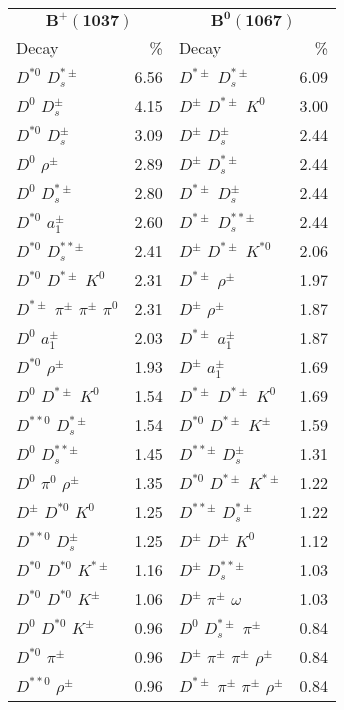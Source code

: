 \documentclass[6pt]{article}
\begin{document}
\begin{tabular}{lr|lr}
\multicolumn{2}{c|}{$\boldsymbol{B^+(1037)}$} & \multicolumn{2}{c}{$\boldsymbol{B^0(1067)}$} \\
Decay & \% & Decay & \% \\ \hline \hline
$D^{*0}$ $D_s^{*\pm}$ & 6.56 & $D^{*\pm}$ $D_s^{*\pm}$ & 6.09 \\
$D^0$ $D_s^{\pm}$ & 4.15 & $D^{\pm}$ $D^{*\pm}$ $K^0$ & 3.00 \\
$D^{*0}$ $D_s^{\pm}$ & 3.09 & $D^{\pm}$ $D_s^{\pm}$ & 2.44 \\
$D^0$ $\rho^{\pm}$ & 2.89 & $D^{\pm}$ $D_s^{*\pm}$ & 2.44 \\
$D^0$ $D_s^{*\pm}$ & 2.80 & $D^{*\pm}$ $D_s^{\pm}$ & 2.44 \\
$D^{*0}$ $a_1^{\pm}$ & 2.60 & $D^{*\pm}$ $D_s^{**\pm}$ & 2.44 \\
$D^{*0}$ $D_s^{**\pm}$ & 2.41 & $D^{\pm}$ $D^{*\pm}$ $K^{*0}$ & 2.06 \\
$D^{*0}$ $D^{*\pm}$ $K^0$ & 2.31 & $D^{*\pm}$ $\rho^{\pm}$ & 1.97 \\
$D^{*\pm}$ $\pi^{\pm}$ $\pi^{\pm}$ $\pi^0$ & 2.31 & $D^{\pm}$ $\rho^{\pm}$ & 1.87 \\
$D^0$ $a_1^{\pm}$ & 2.03 & $D^{*\pm}$ $a_1^{\pm}$ & 1.87 \\
$D^{*0}$ $\rho^{\pm}$ & 1.93 & $D^{\pm}$ $a_1^{\pm}$ & 1.69 \\
$D^0$ $D^{*\pm}$ $K^0$ & 1.54 & $D^{*\pm}$ $D^{*\pm}$ $K^0$ & 1.69 \\
$D^{**0}$ $D_s^{*\pm}$ & 1.54 & $D^{*0}$ $D^{*\pm}$ $K^{\pm}$ & 1.59 \\
$D^0$ $D_s^{**\pm}$ & 1.45 & $D^{**\pm}$ $D_s^{\pm}$ & 1.31 \\
$D^0$ $\pi^0$ $\rho^{\pm}$ & 1.35 & $D^{*0}$ $D^{*\pm}$ $K^{*\pm}$ & 1.22 \\
$D^{\pm}$ $D^{*0}$ $K^0$ & 1.25 & $D^{**\pm}$ $D_s^{*\pm}$ & 1.22 \\
$D^{**0}$ $D_s^{\pm}$ & 1.25 & $D^{\pm}$ $D^{\pm}$ $K^0$ & 1.12 \\
$D^{*0}$ $D^{*0}$ $K^{*\pm}$ & 1.16 & $D^{\pm}$ $D_s^{**\pm}$ & 1.03 \\
$D^{*0}$ $D^{*0}$ $K^{\pm}$ & 1.06 & $D^{\pm}$ $\pi^{\pm}$ $\omega$ & 1.03 \\
$D^0$ $D^{*0}$ $K^{\pm}$ & 0.96 & $D^0$ $D_s^{*\pm}$ $\pi^{\pm}$ & 0.84 \\
$D^{*0}$ $\pi^{\pm}$ & 0.96 & $D^{\pm}$ $\pi^{\pm}$ $\pi^{\pm}$ $\rho^{\pm}$ & 0.84 \\
$D^{**0}$ $\rho^{\pm}$ & 0.96 & $D^{*\pm}$ $\pi^{\pm}$ $\pi^{\pm}$ $\rho^{\pm}$ & 0.84 \\

\end{tabular}
\end{document}

